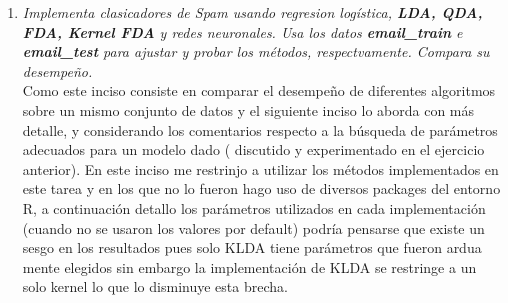 \documentclass[paper=letter, fontsize=11pt]{scrartcl}
\numberwithin{equation}{section} %
\numberwithin{figure}{section} %
\numberwithin{table}{section} %
\begin{document}
\begin{enumerate}
\item \textit{Implementa clasicadores de Spam usando regresion logística, \textbf{LDA, QDA, FDA, Kernel FDA} y redes neuronales. Usa los datos \textbf{email\_train} e \textbf{email\_test} para ajustar y probar los métodos, respectvamente. Compara su desempeño.}\\

Como este inciso consiste en comparar el desempeño de diferentes algoritmos sobre un mismo conjunto de datos y el siguiente inciso lo aborda con más detalle, y considerando los comentarios respecto a la búsqueda de parámetros adecuados para un modelo dado ( discutido y experimentado en el ejercicio anterior). En este inciso me restrinjo a utilizar los métodos implementados en este tarea y en los que no lo fueron hago uso de diversos packages del entorno R, a continuación detallo los parámetros utilizados en cada implementación (cuando no se usaron los valores por default) podría pensarse que existe un sesgo en los resultados pues solo KLDA tiene parámetros que fueron ardua mente elegidos sin embargo la implementación de KLDA se restringe a un solo kernel lo que lo disminuye esta brecha.\\


\end{enumerate}
\end{document}
